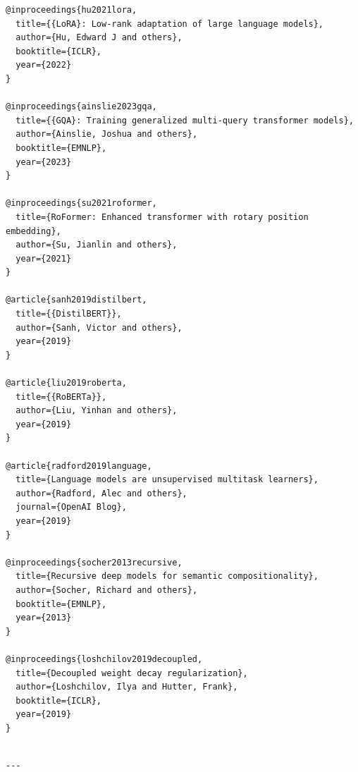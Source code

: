 \begin{lstlisting}
@inproceedings{hu2021lora,
  title={{LoRA}: Low-rank adaptation of large language models},
  author={Hu, Edward J and others},
  booktitle={ICLR},
  year={2022}
}

@inproceedings{ainslie2023gqa,
  title={{GQA}: Training generalized multi-query transformer models},
  author={Ainslie, Joshua and others},
  booktitle={EMNLP},
  year={2023}
}

@inproceedings{su2021roformer,
  title={RoFormer: Enhanced transformer with rotary position embedding},
  author={Su, Jianlin and others},
  year={2021}
}

@article{sanh2019distilbert,
  title={{DistilBERT}},
  author={Sanh, Victor and others},
  year={2019}
}

@article{liu2019roberta,
  title={{RoBERTa}},
  author={Liu, Yinhan and others},
  year={2019}
}

@article{radford2019language,
  title={Language models are unsupervised multitask learners},
  author={Radford, Alec and others},
  journal={OpenAI Blog},
  year={2019}
}

@inproceedings{socher2013recursive,
  title={Recursive deep models for semantic compositionality},
  author={Socher, Richard and others},
  booktitle={EMNLP},
  year={2013}
}

@inproceedings{loshchilov2019decoupled,
  title={Decoupled weight decay regularization},
  author={Loshchilov, Ilya and Hutter, Frank},
  booktitle={ICLR},
  year={2019}
}
\end{lstlisting}
\begin{lstlisting}

---
\end{lstlisting}